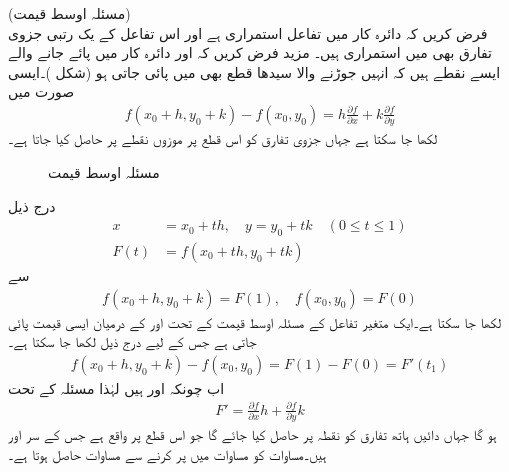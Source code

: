 \quad (مسئلہ اوسط قیمت)\\
فرض کریں کہ دائرہ کار  میں تفاعل  استمراری ہے اور اس تفاعل کے یک رتبی جزوی تفارق بھی  میں استمراری ہیں۔ مزید فرض کریں کہ  اور   دائرہ کار  میں پائے جانے والے ایسے نقطے ہیں کہ انہیں جوڑنے والا سیدھا قطع  بھی  میں پائی جاتی ہو (شکل )۔ایسی صورت میں 
\begin{align}\label{مساوات_الاحصاء_مسئلہ_زنجیری_الف}
f(x_0+h,y_0+k)-f(x_0,y_0)=h\frac{\partial f}{\partial x}+k\frac{\partial f}{\partial y}
\end{align}
لکھا جا سکتا ہے جہاں جزوی تفارق کو  اس قطع پر موزوں نقطے پر حاصل کیا جاتا ہے۔
\begin{figure}
\centering
{}
\caption{مسئلہ اوسط قیمت}
\label{شکل_مسئلہ_الاحصاء_اوسط_قیمت}
\end{figure}
درج ذیل
\begin{align*}
x&=x_0+th,\quad y=y_0+tk\quad (0\le t \le 1)\\
F(t)&=f(x_0+th,y_0+tk)
\end{align*}
سے
\begin{align*}
f(x_0+h,y_0+k)=F(1),\quad f(x_0,y_0)=F(0)
\end{align*}
لکھا جا سکتا ہے۔ایک متغیر تفاعل کے  مسئلہ اوسط قیمت کے تحت  اور  کے درمیان  ایسی قیمت   پائی جاتی ہے جس کے لیے  درج ذیل لکھا جا سکتا ہے۔ 
\begin{align}\label{مساوات_الاحصاء_مسئلہ_زنجیری_ب}
f(x_0+h,y_0+k)-f(x_0,y_0)=F(1)-F(0)=F'(t_1)
\end{align}
اب چونکہ  اور  ہیں لہٰذا مسئلہ  کے تحت
\begin{align}\label{مساوات_الاحصاء_مسئلہ_زنجیری_پ}
F'=\frac{\partial f}{\partial x}h+\frac{\partial f}{\partial y}k
\end{align}
ہو گا جہاں دائیں ہاتھ تفارق کو نقطہ  پر حاصل کیا جائے گا جو اس قطع پر واقع ہے جس کے سر  اور  ہیں۔مساوات  کو مساوات  میں پر کرنے سے  مساوات  حاصل ہوتا ہے۔

